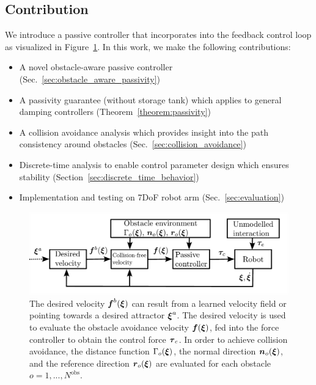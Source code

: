 \subsection{Contribution}
We introduce a passive controller that incorporates into the feedback control loop as visualized in Figure~\ref{fig:control_scheme_passive}. 
In this work, we make the following contributions:
\begin{itemize}
\item A novel obstacle-aware passive controller
(Sec.~\ref{sec:obstacle_aware_passivity})
\item A passivity guarantee (without storage tank) which applies to general damping controllers (Theorem~\ref{theorem:passivity})
\ifthesis
{}
\else
\item A collision avoidance analysis which provides insight into the path consistency around obstacles (Sec.~\ref{sec:collision_avoidance})
\fi
\iflong
\item Discrete-time analysis to enable control parameter design which ensures stability (Section~\ref{sec:discrete_time_behavior})
\else
\fi
\item Implementation and testing on 7DoF robot arm (Sec.~\ref{sec:evaluation})
\end{itemize}

\begin{figure}[thb]
  \center
  \includegraphics[width=1.0\columnwidth]{figures/control_scheme_passive.pdf}
\caption{The desired velocity $\boldsymbol{f}^b(\boldsymbol{\xi})$ can result from a learned velocity field or pointing towards a desired attractor $\boldsymbol{\xi}^a$. The desired velocity is used to evaluate the obstacle avoidance velocity $\boldsymbol{f}(\boldsymbol{\xi})$, fed into the force controller to obtain the control force $\boldsymbol{\tau}_c$. In order to achieve collision avoidance, the distance function $\Gamma_o(\boldsymbol{\xi})$, the normal direction $\boldsymbol{n}_o(\boldsymbol{\xi})$, and the reference direction $\boldsymbol{r}_o(\boldsymbol{\xi})$ are evaluated for each obstacle $o = 1, ..., N^\mathrm{{obs}}$.}
\label{fig:control_scheme_passive}
\end{figure}
